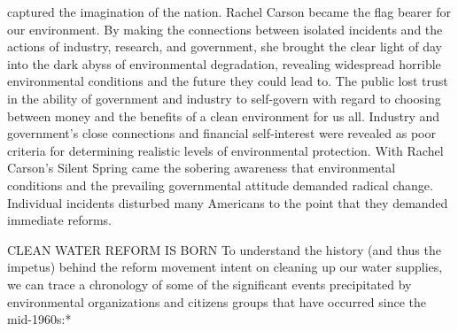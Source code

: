 \documentclass{article}
\begin{document}
captured the imagination of the nation. Rachel Carson became the flag
bearer for our environment. By making the connections between isolated
incidents and the actions of industry, research, and government, she
brought the clear light of day into the dark abyss of environmental
degradation, revealing widespread horrible environmental conditions and
the future they could lead to. The public lost trust in the ability of
government and industry to self-govern with regard to choosing between
money and the benefits of a clean environment for us all. Industry and
government's close connections and financial self-interest were revealed
as poor criteria for determining realistic levels of environmental
protection. With Rachel Carson's Silent Spring came the sobering
awareness that environmental conditions and the prevailing governmental
attitude demanded radical change. Individual incidents disturbed many
Americans to the point that they demanded immediate reforms.

CLEAN WATER REFORM IS BORN To understand the history (and thus the
impetus) behind the reform movement intent on cleaning up our water
supplies, we can trace a chronology of some of the significant events
precipitated by environmental organizations and citizens groups that
have occurred since the mid-1960s:*
\end{document}

